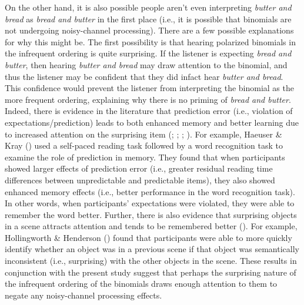 \documentclass[
  12pt,
]{scrartcl}
\begin{document}
On the other hand, it is also possible people aren't even interpreting
\emph{butter and bread} as \emph{bread and butter} in the first place
(i.e., it is possible that binomials are not undergoing noisy-channel
processing). There are a few possible explanations for why this might
be. The first possibility is that hearing polarized binomials in the
infrequent ordering is quite surprising. If the listener is expecting
\emph{bread and butter}, then hearing \emph{butter and bread} may draw
attention to the binomial, and thus the listener may be confident that
they did infact hear \emph{butter and bread}. This confidence would
prevent the listener from interpreting the binomial as the more frequent
ordering, explaining why there is no priming of \emph{bread and butter}.
Indeed, there is evidence in the literature that prediction error (i.e.,
violation of expectations/prediction) leads to both enhanced memory and
better learning due to increased attention on the surprising item
(;
; ;
). For example,
Haeuser \& Kray () used a
self-paced reading task followed by a word recognition task to examine
the role of prediction in memory. They found that when participants
showed larger effects of prediction error (i.e., greater residual
reading time differences between unpredictable and predictable items),
they also showed enhanced memory effects (i.e., better performance in
the word recognition task). In other words, when participants'
expectations were violated, they were able to remember the word better.
Further, there is also evidence that surprising objects in a scene
attracts attention and tends to be remembered better
(). For example, Hollingworth \& Henderson
() found that participants
were able to more quickly identify whether an object was in a previous
scene if that object was semantically inconsistent (i.e., surprising)
with the other objects in the scene. These results in conjunction with
the present study suggest that perhaps the surprising nature of the
infrequent ordering of the binomials draws enough attention to them to
negate any noisy-channel processing effects.
\end{document}
